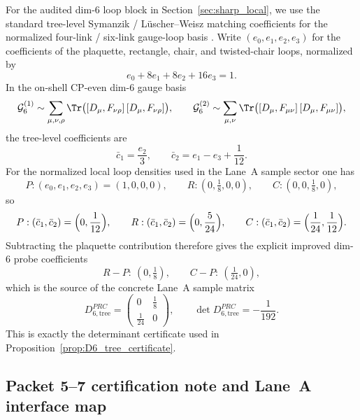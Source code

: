 For the audited dim-$6$ loop block in Section~\ref{sec:sharp_local}, we use the standard tree-level Symanzik / L\"uscher--Weisz matching coefficients for the normalized four-link / six-link gauge-loop basis \cite{LuscherWeisz1985,Husung2023}.
Write $(e_0,e_1,e_2,e_3)$ for the coefficients of the plaquette, rectangle, chair, and twisted-chair loops, normalized by
\begin{equation}\label{eq:appendixL_loop_norm}
e_0+8e_1+8e_2+16e_3=1.
\end{equation}
In the on-shell CP-even dim-$6$ gauge basis
\[
\mathcal G_{6}^{(1)}\sim \sum_{\mu,\nu,\rho}\Tr\big([D_\mu,F_{\nu\rho}]\,[D_\mu,F_{\nu\rho}]\big),
\qquad
\mathcal G_{6}^{(2)}\sim \sum_{\mu,\nu}\Tr\big([D_\mu,F_{\mu\nu}]\,[D_\mu,F_{\mu\nu}]\big),
\]
the tree-level coefficients are
\begin{equation}\label{eq:appendixL_loop_dim6_coeffs}
\bar c_1=\frac{e_2}{3},
\qquad
\bar c_2=e_1-e_3+\frac1{12}.
\end{equation}
For the normalized local loop densities used in the Lane~A sample sector one has
\[
P:(e_0,e_1,e_2,e_3)=(1,0,0,0),
\qquad
R:(0,\tfrac18,0,0),
\qquad
C:(0,0,\tfrac18,0),
\]
so
\begin{equation}\label{eq:appendixL_PRC_coeff_table}
P:(\bar c_1,\bar c_2)=\Bigl(0,\frac1{12}\Bigr),
\qquad
R:(\bar c_1,\bar c_2)=\Bigl(0,\frac5{24}\Bigr),
\qquad
C:(\bar c_1,\bar c_2)=\Bigl(\frac1{24},\frac1{12}\Bigr).
\end{equation}
Subtracting the plaquette contribution therefore gives the explicit improved dim-$6$ probe coefficients
\begin{equation}\label{eq:appendixL_PRC_improved_matrix}
R-P:\ (0,\tfrac18),
\qquad
C-P:\ (\tfrac1{24},0),
\end{equation}
which is the source of the concrete Lane~A sample matrix
\[
D_{6,\mathrm{tree}}^{PRC}=\begin{pmatrix}0&\tfrac18\\[0.35em]\tfrac1{24}&0\end{pmatrix},
\qquad
\det D_{6,\mathrm{tree}}^{PRC}=-\frac1{192}.
\]
This is exactly the determinant certificate used in Proposition~\ref{prop:D6_tree_certificate}.


\subsection{Packet 5--7 certification note and Lane~A interface map}
\label{subsec:LaneA_packet_interface_map}

